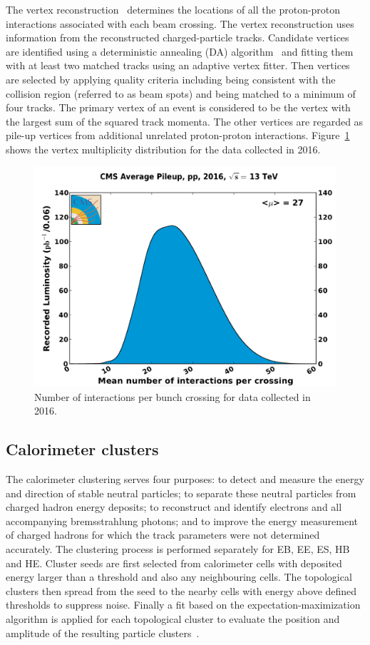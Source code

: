 \vspace{0.3cm}
The vertex reconstruction~\cite{ob_vertexconst} determines the locations of all the proton-proton interactions associated with each beam crossing. The vertex reconstruction uses information from the reconstructed charged-particle tracks. Candidate vertices are identified using a deterministic annealing (DA) algorithm~\cite{ob_DAvertex} and fitting them with at least two matched tracks using an adaptive vertex fitter. Then vertices are selected by applying quality criteria including being consistent with the collision region (referred to as beam spots) and being matched to a minimum of four tracks. The primary vertex of an event is considered to be the vertex with the largest sum of the squared track momenta. The other vertices are regarded as pile-up vertices from additional unrelated proton-proton interactions. Figure~\ref{fig:ob_Nvertex} shows the vertex multiplicity distribution for the data collected in 2016.
\begin{figure}[htbp]
\begin{center}
\includegraphics[width=0.72\linewidth]{figures/ob_Nvertex.png}
\caption{Number of interactions per bunch crossing for data collected in 2016.}
\label{fig:ob_Nvertex}
\end{center}
\end{figure}

\subsection{Calorimeter clusters}
The calorimeter clustering serves four purposes: to detect and measure the energy and direction of stable neutral particles; to separate these neutral particles from charged hadron energy deposits; to reconstruct and identify electrons and all accompanying bremsstrahlung photons; and to improve the energy measurement of charged hadrons for which the track parameters were not determined accurately. The clustering process is performed separately for EB, EE, ES, HB and HE. Cluster seeds are first selected from calorimeter cells with deposited energy larger than a threshold and also any neighbouring cells. The topological clusters then spread from the seed to the nearby cells with energy above defined thresholds to suppress noise. Finally a fit based on the expectation-maximization algorithm is applied for each topological cluster to evaluate the position and amplitude of the resulting particle clusters~\cite{ob_pf}. 

